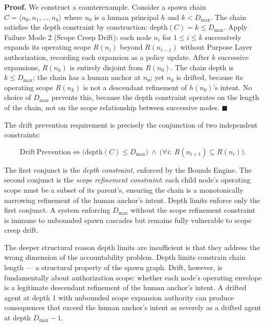 \medskip
\noindent\textbf{Proof.} We construct a counterexample. Consider a spawn chain $C = \langle n_0, n_1, \ldots, n_k \rangle$ where $n_0$ is a human principal $h$ and $k < D_{\max}$. The chain satisfies the depth constraint by construction: $\mathrm{depth}(C) = k \leq D_{\max}$. Apply Failure Mode 2 (Scope Creep Drift): each node $n_i$ for $1 \leq i \leq k$ successively expands its operating scope $R(n_i)$ beyond $R(n_{i-1})$ without Purpose Layer authorization, recording each expansion as a policy update. After $k$ successive expansions, $R(n_k)$ is entirely disjoint from $R(n_0)$. The chain depth is $k \leq D_{\max}$; the chain has a human anchor at $n_0$; yet $n_k$ is drifted, because its operating scope $R(n_k)$ is not a descendant refinement of $h(n_0)$'s intent. No choice of $D_{\max}$ prevents this, because the depth constraint operates on the length of the chain, not on the scope relationship between successive nodes. $\blacksquare$

\bigskip
The drift prevention requirement is precisely the conjunction of two independent constraints:

\begin{equation}
\mathrm{Drift\ Prevention} \iff \bigl( \mathrm{depth}(C) \leq D_{\max} \bigr)\ \land\ \bigl( \forall i:\ R(n_{i+1}) \subseteq R(n_i) \bigr).
\label{eq:drift-prevention-constraint}
\end{equation}

The first conjunct is the \emph{depth constraint}, enforced by the Bounds Engine. The second conjunct is the \emph{scope refinement constraint}: each child node's operating scope must be a subset of its parent's, ensuring the chain is a monotonically narrowing refinement of the human anchor's intent. Depth limits enforce only the first conjunct. A system enforcing $D_{\max}$ without the scope refinement constraint is immune to unbounded spawn cascades but remains fully vulnerable to scope creep drift.

The deeper structural reason depth limits are insufficient is that they address the wrong dimension of the accountability problem. Depth limits constrain chain length — a structural property of the spawn graph. Drift, however, is fundamentally about authorization scope: whether each node's operating envelope is a legitimate descendant refinement of the human anchor's intent. A drifted agent at depth 1 with unbounded scope expansion authority can produce consequences that exceed the human anchor's intent as severely as a drifted agent at depth $D_{\max} - 1$.

